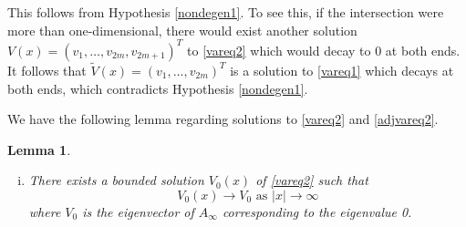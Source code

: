\documentclass[12pt]{article}
\newtheorem{lemma}{Lemma}
\begin{document}
This follows from Hypothesis \ref{nondegen1}. To see this, if the intersection were more than one-dimensional, there would exist another solution $V(x) = (v_1, \dots, v_{2m}, v_{2m+1})^T$ to \eqref{vareq2} which would decay to 0 at both ends. It follows that $\tilde{V}(x) = (v_1, \dots, v_{2m})^T$ is a solution to \eqref{vareq1} which decays at both ends, which contradicts Hypothesis \ref{nondegen1}.

We have the following lemma regarding solutions to \eqref{vareq2} and \eqref{adjvareq2}.

\begin{lemma}\label{adjsolutions}
\begin{enumerate}[(i)]
\item There exists a bounded solution $V_0(x)$ of \eqref{vareq2} such that 
\begin{equation}
V_0(x) \rightarrow V_0 \text{ as }|x| \rightarrow \infty
\end{equation}
where $V_0$ is the eigenvector of $A_\infty$ corresponding to the eigenvalue 0.


\end{enumerate}
\end{lemma}
\end{document}
